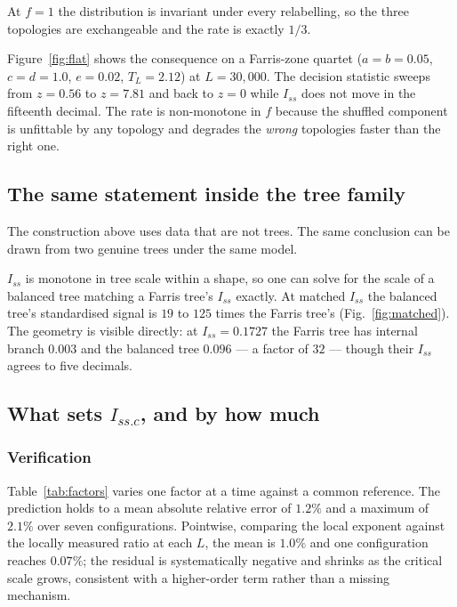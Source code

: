 \documentclass[preprint,12pt,authoryear]{elsarticle}
\newcommand{\Iss}{I_{ss}}
\newcommand{\Issc}{I_{ss.c}}
\newcommand{\TL}{T_L}
\theoremstyle{definition}
\theoremstyle{remark}
\begin{document}
At $f=1$ the distribution is invariant under every relabelling, so the three
topologies are exchangeable and the rate is exactly $1/3$.

Figure~\ref{fig:flat} shows the consequence on a Farris-zone quartet
($a=b=0.05$, $c=d=1.0$, $e=0.02$, $\TL=2.12$) at $L=30{,}000$. The decision
statistic sweeps from $z=0.56$ to $z=7.81$ and back to $z=0$ while $\Iss$
does not move in the fifteenth decimal. The rate is non-monotone in $f$
because the shuffled component is unfittable by any topology and degrades the
\emph{wrong} topologies faster than the right one.

\subsection{The same statement inside the tree family}
\label{sec:matched}

The construction above uses data that are not trees. The same conclusion can
be drawn from two genuine trees under the same model.

$\Iss$ is monotone in tree scale within a shape, so one can solve for the
scale of a balanced tree matching a Farris tree's $\Iss$ exactly. At matched
$\Iss$ the balanced tree's standardised signal is $19$ to $125$ times the
Farris tree's (Fig.~\ref{fig:matched}). The geometry is visible directly: at
$\Iss=0.1727$ the Farris tree has internal branch $0.003$ and the balanced
tree $0.096$ --- a factor of $32$ --- though their $\Iss$ agrees to five
decimals.

\subsection{What sets $\Issc$, and by how much}
\label{sec:factors-results}


\subsubsection{Verification}

Table~\ref{tab:factors} varies one factor at a time against a common
reference. The prediction holds to a mean absolute relative error of
$1.2\%$ and a maximum of $2.1\%$ over seven configurations. Pointwise,
comparing the local exponent against the locally measured ratio at each $L$,
the mean is $1.0\%$ and one configuration reaches $0.07\%$; the residual is
systematically negative and shrinks as the critical scale grows, consistent
with a higher-order term rather than a missing mechanism.
\end{document}
